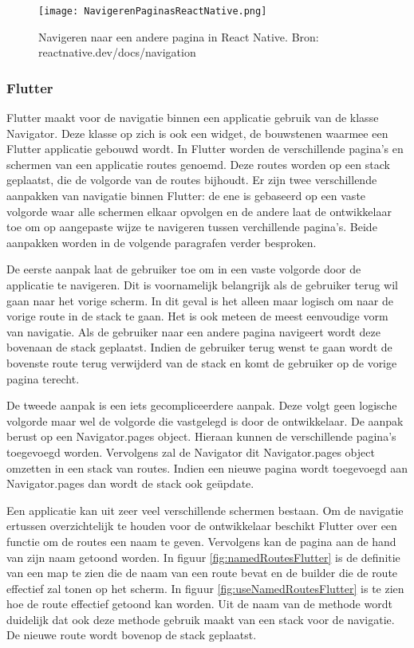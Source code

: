 \begin{figure}
    \texttt{[image: NavigerenPaginasReactNative.png]}
    \caption{Navigeren naar een andere pagina in React Native. Bron: reactnative.dev/docs/navigation}
    \label{fig:navigerenReactNative}
\end{figure}

\subsubsection{Flutter}
\label{subsubsec:navigatieFlutter}

Flutter maakt voor de navigatie binnen een applicatie gebruik van de klasse Navigator. Deze klasse op zich is ook een widget, de bouwstenen waarmee een Flutter applicatie gebouwd wordt. In Flutter worden de verschillende pagina's en schermen van een applicatie routes genoemd. Deze routes worden op een stack geplaatst, die de volgorde van de routes bijhoudt. Er zijn twee verschillende aanpakken van navigatie binnen Flutter: de ene is gebaseerd op een vaste volgorde waar alle schermen elkaar opvolgen en de andere laat de ontwikkelaar toe om op aangepaste wijze te navigeren tussen verchillende pagina's. Beide aanpakken worden in de volgende paragrafen verder besproken. 

De eerste aanpak laat de gebruiker toe om in een vaste volgorde door de applicatie te navigeren. Dit is voornamelijk belangrijk als de gebruiker terug wil gaan naar het vorige scherm. In dit geval is het alleen maar logisch om naar de vorige route in de stack te gaan. Het is ook meteen de meest eenvoudige vorm van navigatie. Als de gebruiker naar een andere pagina navigeert wordt deze bovenaan de stack geplaatst. Indien de gebruiker terug wenst te gaan wordt de bovenste route terug verwijderd van de stack en komt de gebruiker op de vorige pagina terecht.

De tweede aanpak is een iets gecompliceerdere aanpak. Deze volgt geen logische volgorde maar wel de volgorde die vastgelegd is door de ontwikkelaar. De aanpak berust op een Navigator.pages object. Hieraan kunnen de verschillende pagina's toegevoegd worden. Vervolgens zal de Navigator dit Navigator.pages object omzetten in een stack van routes. Indien een nieuwe pagina wordt toegevoegd aan Navigator.pages dan wordt de stack ook geüpdate. 

Een applicatie kan uit zeer veel verschillende schermen bestaan. Om de navigatie ertussen overzichtelijk te houden voor de ontwikkelaar beschikt Flutter over een functie om de routes een naam te geven. Vervolgens kan de pagina aan de hand van zijn naam getoond worden. In figuur \ref{fig:namedRoutesFlutter} is de definitie van een map te zien die de naam van een route bevat en de builder die de route effectief zal tonen op het scherm. In figuur \ref{fig:useNamedRoutesFlutter} is te zien hoe de route effectief getoond kan worden. Uit de naam van de methode wordt duidelijk dat ook deze methode gebruik maakt van een stack voor de navigatie. De nieuwe route wordt bovenop de stack geplaatst.

